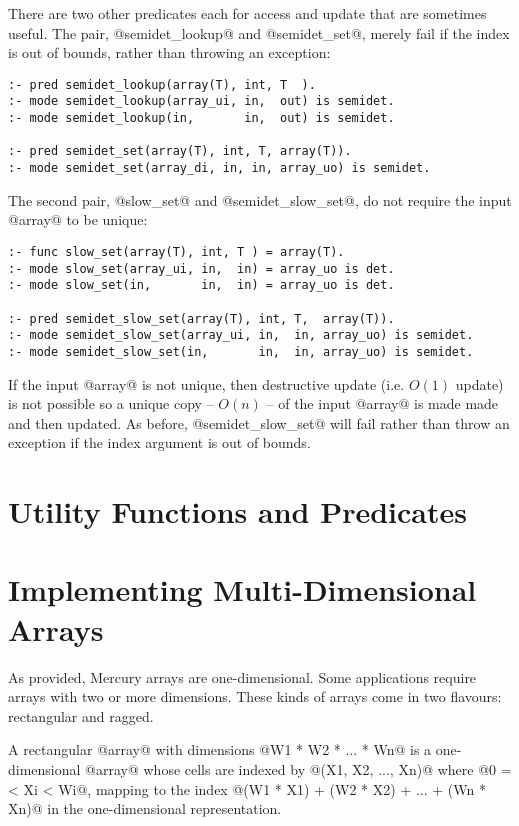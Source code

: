 There are two other predicates each for access and update that are
sometimes useful.  The pair, @semidet_lookup@ and @semidet_set@, merely
fail if the index is out of bounds, rather than throwing an exception:
\begin{verbatim}
:- pred semidet_lookup(array(T), int, T  ).
:- mode semidet_lookup(array_ui, in,  out) is semidet.
:- mode semidet_lookup(in,       in,  out) is semidet.

:- pred semidet_set(array(T), int, T, array(T)).
:- mode semidet_set(array_di, in, in, array_uo) is semidet.
\end{verbatim}

The second pair, @slow_set@ and @semidet_slow_set@, do not require the
input @array@ to be unique:
\begin{verbatim}
:- func slow_set(array(T), int, T ) = array(T).
:- mode slow_set(array_ui, in,  in) = array_uo is det.
:- mode slow_set(in,       in,  in) = array_uo is det.

:- pred semidet_slow_set(array(T), int, T,  array(T)).
:- mode semidet_slow_set(array_ui, in,  in, array_uo) is semidet.
:- mode semidet_slow_set(in,       in,  in, array_uo) is semidet.
\end{verbatim}
If the input @array@ is not unique, then destructive update (i.e. $O(1)$
update) is not possible so a unique copy -- $O(n)$ -- of the input
@array@ is made made and then updated.  As before, @semidet_slow_set@
will fail rather than throw an exception if the index argument is out of
bounds.


\section{Utility Functions and Predicates}


\section{Implementing Multi-Dimensional Arrays}

As provided, Mercury arrays are one-dimensional.  Some applications
require arrays with two or more dimensions.  These kinds of arrays come
in two flavours: rectangular and ragged.

A rectangular @array@ with dimensions @W1 * W2 * ... * Wn@ is a
one-dimensional @array@ whose cells are indexed by @(X1, X2, ..., Xn)@
where @0 =< Xi < Wi@, mapping to the index
@(W1 * X1) + (W2 * X2) + ... + (Wn * Xn)@ in the one-dimensional
representation.

